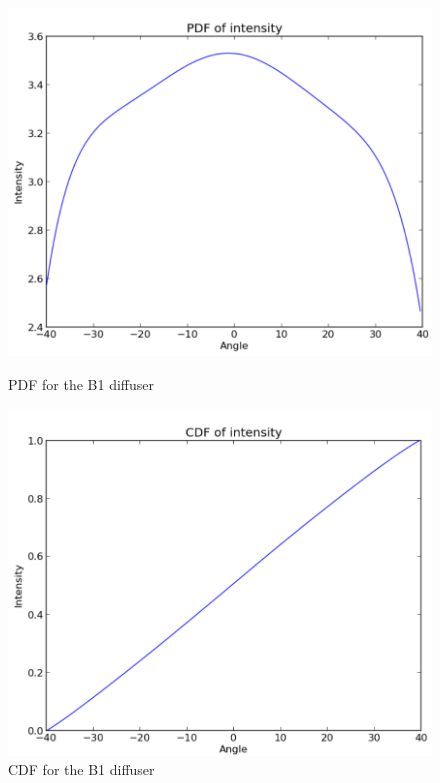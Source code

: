 \begin{figure}
    \centering
    
    \begin{minipage}{0.5\textwidth}
        \centering
        \includegraphics[width=\textwidth]{Figures/B1_diff_pdf.png} %
        \caption{PDF for the B1 diffuser}
    \end{minipage}\hfill
    \begin{minipage}{0.5\textwidth}
        \centering
        \includegraphics[width=\textwidth]{Figures/B1_diff_cdf.PNG} %
        \caption{CDF for the B1 diffuser}
        \label{fig:B1_PDF_CDF_diff}
    \end{minipage}
\end{figure}


